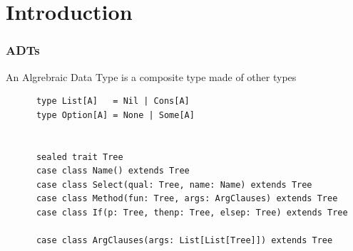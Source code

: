 \section{Introduction}
\begin{frame}[fragile]
  \frametitle{ADTs}

  An Algrebraic Data Type is a composite type made of other types

  \begin{example}
    \begin{lstlisting}
      type List[A]   = Nil | Cons[A]
      type Option[A] = None | Some[A]


      sealed trait Tree
      case class Name() extends Tree
      case class Select(qual: Tree, name: Name) extends Tree
      case class Method(fun: Tree, args: ArgClauses) extends Tree
      case class If(p: Tree, thenp: Tree, elsep: Tree) extends Tree

      case class ArgClauses(args: List[List[Tree]]) extends Tree
    \end{lstlisting}
  \end{example}
\end{frame}

